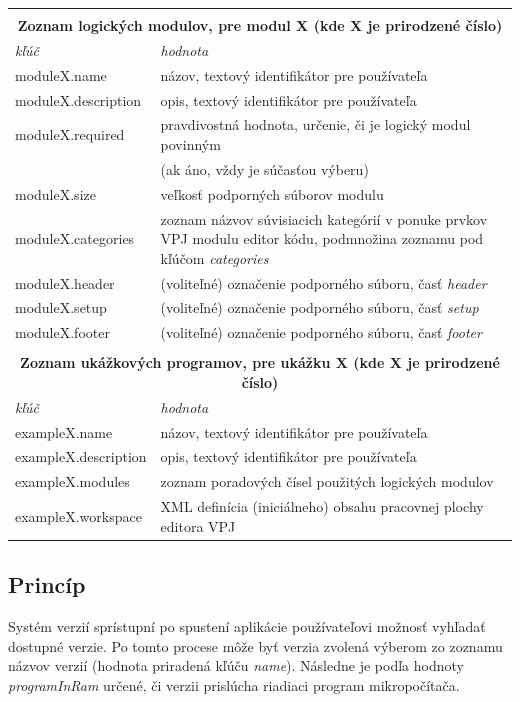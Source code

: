 \begin{table}
\begin{tabular}{ |p{3.8cm}|p{10cm}|  }
 \multicolumn{2}{c}{} \\
 \multicolumn{2}{c}{\textbf{Zoznam logických modulov, pre modul X (kde X je prirodzené číslo)}} \\
 \hline
	\textit{kľúč} & \textit{hodnota}\\
 \hline
	moduleX.name&názov, textový identifikátor pre používateľa\\
	moduleX.description&opis, textový identifikátor pre používateľa\\
	moduleX.required&pravdivostná hodnota, určenie, či je logický modul povinným\\
	&(ak áno, vždy je súčasťou výberu)\\
	moduleX.size&veľkosť podporných súborov modulu\\
	moduleX.categories&zoznam názvov súvisiacich kategórií v ponuke prvkov VPJ modulu editor kódu, podmnožina zoznamu pod kľúčom \textit{categories}\\
	moduleX.header&(voliteľné) označenie podporného súboru, časť \textit{header}\\
	moduleX.setup&(voliteľné) označenie podporného súboru, časť \textit{setup}\\
	moduleX.footer&(voliteľné) označenie podporného súboru, časť \textit{footer}\\
 \hline

 \multicolumn{2}{c}{} \\
 \multicolumn{2}{c}{\textbf{Zoznam ukážkových programov, pre ukážku X (kde X je prirodzené číslo)}} \\
 \hline
	\textit{kľúč} & \textit{hodnota}\\
 \hline
	exampleX.name&názov, textový identifikátor pre používateľa\\
	exampleX.description&opis, textový identifikátor pre používateľa\\
	exampleX.modules&zoznam poradových čísel použitých logických modulov\\
	exampleX.workspace&XML definícia (iniciálneho) obsahu pracovnej plochy editora VPJ\\
 \hline
\end{tabular}
\end{table}\normalsize

\subsection{Princíp}
Systém verzií sprístupní po spustení aplikácie používateľovi možnosť vyhľadať dostupné verzie. Po tomto procese môže byť verzia zvolená výberom zo zoznamu názvov verzií (hodnota priradená kľúču \textit{name}). Následne je podľa hodnoty \textit{programInRam} určené, či verzii prislúcha  riadiaci program mikropočítača.

